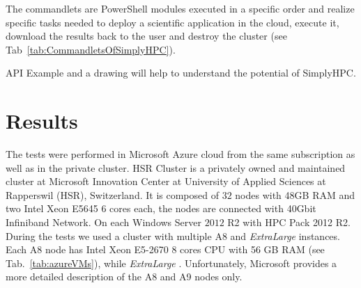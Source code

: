 \documentclass[3p,times]{elsarticle}
\begin{document}
The commandlets are PowerShell modules executed in a specific order and realize specific tasks needed to deploy a scientific application in the cloud, execute it, download the results back to the user and destroy the cluster (see Tab~\ref{tab:CommandletsOfSimplyHPC}).  

\textcolor[rgb]{1,0,0}{API Example and a drawing will help to understand the potential of SimplyHPC.}

\section{Results}
\label{sec:results}
	
The tests were performed in Microsoft Azure cloud from the same subscription as well as in the private cluster. HSR Cluster is a privately owned and maintained cluster at Microsoft Innovation Center at University of Applied Sciences at Rapperswil (HSR), Switzerland. It is composed of $32$ nodes with 48GB RAM and two Intel Xeon E5645 6 cores each, the nodes are connected with 40Gbit Infiniband Network. On each Windows Server $2012$ R2 with HPC Pack 2012 R2. During the tests we used a cluster with multiple A8 and \textit{ExtraLarge} instances. Each A8 node has Intel Xeon E5-2670 8 cores CPU with 56 GB RAM (see Tab.~\ref{tab:azureVMs}), while \textit{ExtraLarge} .  Unfortunately, Microsoft provides a more detailed description of the A8 and A9 nodes only. 
\end{document}
